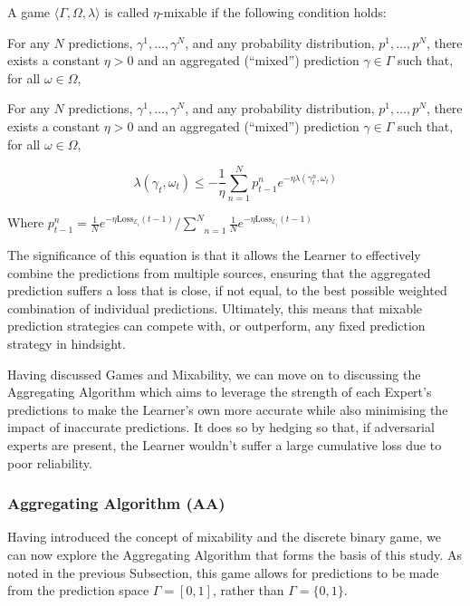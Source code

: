 A game $\langle \Gamma, \Omega, \lambda \rangle$ is called $\eta$-mixable if the following condition holds:

For any $N$ predictions, $\gamma^1, \ldots, \gamma^N$, and any probability distribution, $p^1, \ldots, p^N$, there exists a constant $\eta>0$ and an aggregated (``mixed'') prediction $\gamma \in \Gamma$ such that, for all $\omega \in \Omega$,

\begin{center}
    For any $N$ predictions, $\gamma^1, \ldots, \gamma^N$, and any probability distribution, $p^1, \ldots, p^N$, there exists a constant $\eta>0$ and an aggregated (``mixed'') prediction $\gamma \in \Gamma$ such that, for all $\omega \in \Omega$,
\end{center}
\begin{equation}
    \lambda(\gamma_t, \omega_t) \leq - \frac{1}{\eta} \underset{n=1}{\overset{N}{\sum}}p^n_{t-1}e^{-\eta\lambda(\gamma^n_t, \omega_t)}
\end{equation}

Where $p^n_{t-1} = \frac{1}{N}e^{-\eta\text{Loss}_{\mathcal{E}_i}(t-1)} / \underset{n=1}{\overset{N}{\sum}}\frac{1}{N}e^{-\eta\text{Loss}_{\mathcal{E}_i}(t-1)}$

The significance of this equation is that it allows the Learner to effectively combine the predictions from multiple sources, ensuring that the aggregated prediction suffers a loss that is close, if not equal, to the best possible weighted combination of individual predictions. Ultimately, this means that mixable prediction strategies can compete with, or outperform, any fixed prediction strategy in hindsight.

Having discussed Games and Mixability, we can move on to discussing the Aggregating Algorithm which aims to leverage the strength of each Expert's predictions to make the Learner's own more accurate while also minimising the impact of inaccurate predictions. It does so by hedging so that, if adversarial experts are present, the Learner wouldn't suffer a large cumulative loss due to poor reliability.



\subsubsection{Aggregating Algorithm (AA)}\label{subsubsection:aggregating_algorithm}
Having introduced the concept of mixability and the discrete binary game, we can now explore the Aggregating Algorithm that forms the basis of this study. As noted in the previous Subsection, this game allows for predictions to be made from the prediction space $\Gamma = [0, 1]$, rather than $\Gamma = \{0, 1\}$.

